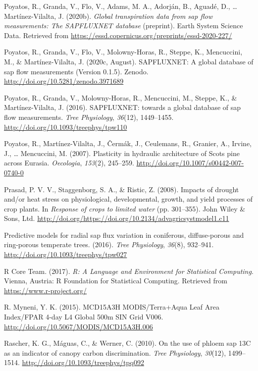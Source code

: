 \documentclass[11pt,twoside]{reedthesis}
\begin{document}
\hypertarget{ref-poyatos_global_2020}{}
Poyatos, R., Granda, V., Flo, V., Adams, M. A., Adorján, B., Aguadé, D.,
\ldots{} Martínez-Vilalta, J. (2020b). \emph{Global transpiration data
from sap flow measurements: The SAPFLUXNET database} (preprint). Earth
System Science Data. Retrieved from
\url{https://essd.copernicus.org/preprints/essd-2020-227/}

\hypertarget{ref-rafael_poyatos_2020}{}
Poyatos, R., Granda, V., Flo, V., Molowny-Horas, R., Steppe, K.,
Mencuccini, M., \& Martínez-Vilalta, J. (2020c, August). SAPFLUXNET: A
global database of sap flow measurements (Version 0.1.5). Zenodo.
\url{http://doi.org/10.5281/zenodo.3971689}

\hypertarget{ref-Poyatos2016}{}
Poyatos, R., Granda, V., Molowny-Horas, R., Mencuccini, M., Steppe, K.,
\& Martínez-Vilalta, J. (2016). SAPFLUXNET: towards a global database of
sap flow measurements. \emph{Tree Physiology}, \emph{36}(12),
1449--1455. \url{http://doi.org/10.1093/treephys/tpw110}

\hypertarget{ref-Poyatos2007}{}
Poyatos, R., Martínez-Vilalta, J., Čermák, J., Ceulemans, R., Granier,
A., Irvine, J., \ldots{} Mencuccini, M. (2007). Plasticity in hydraulic
architecture of Scots pine across Eurasia. \emph{Oecologia},
\emph{153}(2), 245--259. \url{http://doi.org/10.1007/s00442-007-0740-0}

\hypertarget{ref-Prasad2008}{}
Prasad, P. V. V., Staggenborg, S. A., \& Ristic, Z. (2008). Impacts of
drought and/or heat stress on physiological, developmental, growth, and
yield processes of crop plants. In \emph{Response of crops to limited
water} (pp. 301--355). John Wiley \& Sons, Ltd.
\url{http://doi.org/https://doi.org/10.2134/advagricsystmodel1.c11}

\hypertarget{ref-Berdanier2016}{}
Predictive models for radial sap flux variation in coniferous,
diffuse-porous and ring-porous temperate trees. (2016). \emph{Tree
Physiology}, \emph{36}(8), 932--941.
\url{http://doi.org/10.1093/treephys/tpw027}

\hypertarget{ref-RCoreTeam2017}{}
R Core Team. (2017). \emph{R: A Language and Environment for Statistical
Computing}. Vienna, Austria: R Foundation for Statistical Computing.
Retrieved from \url{https://www.r-project.org/}

\hypertarget{ref-Myneni2015}{}
R. Myneni, Y. K. (2015). MCD15A3H MODIS/Terra+Aqua Leaf Area Index/FPAR
4-day L4 Global 500m SIN Grid V006.
\url{http://doi.org/10.5067/MODIS/MCD15A3H.006}

\hypertarget{ref-Rascher2010}{}
Rascher, K. G., Máguas, C., \& Werner, C. (2010). On the use of phloem
sap 13C as an indicator of canopy carbon discrimination. \emph{Tree
Physiology}, \emph{30}(12), 1499--1514.
\url{http://doi.org/10.1093/treephys/tpq092}
\end{document}
